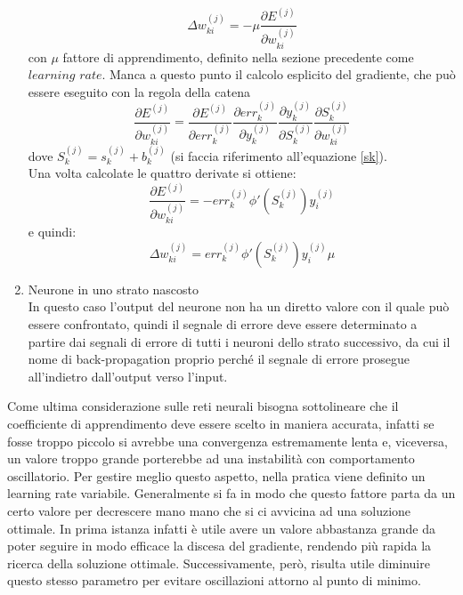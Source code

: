 \begin{enumerate}
\begin{equation}
	\Delta w_{ki}^{(j)} = -\mu \frac{\partial E^{(j)} }{\partial w_{ki}^{(j)}}
	\end{equation}
	con $\mu$ fattore di apprendimento, definito nella sezione precedente come $\textit{learning rate}$.
	Manca a questo punto il calcolo esplicito del gradiente, che può essere eseguito con la regola della catena 
	\begin{equation}
	\frac{\partial E^{(j)} }{\partial w_{ki}^{(j)}} = \frac{\partial E^{(j)}}{\partial err_k^{(j)}}
	\frac{\partial err_k^{(j)}}{\partial y_k^{(j)}}
	\frac{\partial y_k^{(j)}}{\partial S_k^{(j)}}
	\frac{\partial S_k^{(j)}}{\partial w_{ki}^{(j)}}
	\end{equation}
	dove $S_k^{(j)} = s_k^{(j)} + b_k^{(j)} $ (si faccia riferimento all'equazione \eqref{sk}). \\
	Una volta calcolate le quattro derivate si ottiene:
	\begin{equation}
	\frac{\partial E^{(j)} }{\partial w_{ki}^{(j)}} =
	-err_k^{(j)}\phi'(S_k^{(j)})y_i^{(j)}
	\end{equation}
	e quindi:
	\begin{equation}
	\Delta w_{ki}^{(j)} = err_k^{(j)}\phi'(S_k^{(j)})y_i^{(j)} \mu
	\end{equation}
	
	\item Neurone in uno strato nascosto \\
	In questo caso l'output del neurone non ha un diretto valore con il quale può essere confrontato, quindi il segnale di errore deve essere determinato a partire dai segnali di errore di tutti i neuroni dello strato successivo, da cui il nome di back-propagation proprio perché il segnale di errore prosegue all'indietro dall'output verso l'input.
\end{enumerate}
Come ultima considerazione sulle reti neurali bisogna sottolineare che il coefficiente di apprendimento deve essere scelto in maniera accurata, infatti se fosse troppo piccolo si avrebbe una convergenza estremamente lenta e, viceversa, un valore troppo grande porterebbe ad una instabilità con comportamento oscillatorio. Per gestire meglio questo aspetto, nella pratica viene definito un learning rate variabile. Generalmente si fa in modo che questo fattore parta da un certo valore per decrescere mano mano che si ci avvicina ad una soluzione ottimale. In prima istanza infatti è utile avere un valore abbastanza grande da poter seguire in modo efficace la discesa del gradiente, rendendo più rapida la ricerca della soluzione ottimale. Successivamente, però, risulta utile diminuire questo stesso parametro per evitare oscillazioni attorno al punto di minimo.

